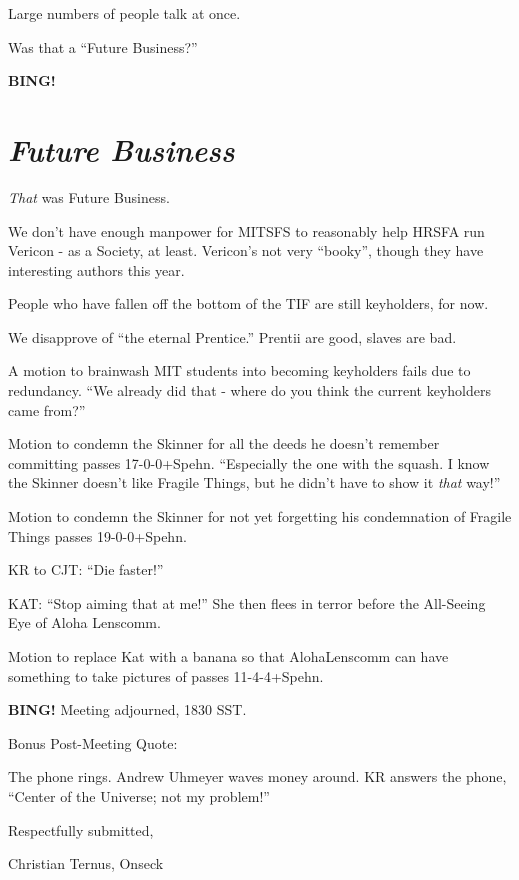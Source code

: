 \documentclass[10pt]{article}
\newcommand{\bing}{{\bf BING!} }
\newcommand{\goto}[1]{\bing \vskip 12pt \section*{{\em{#1}}}}
\begin{document}
Large numbers of people talk at once.

Was that a ``Future Business?''

\goto{Future Business}

\emph{That} was Future Business.

We don't have enough manpower for MITSFS to reasonably help HRSFA run Vericon - as a Society, at least.  Vericon's not very ``booky'', though they have interesting authors this year.

People who have fallen off the bottom of the TIF are still keyholders, for now.

We disapprove of ``the eternal Prentice.''  Prentii are good, slaves are bad.

A motion to brainwash MIT students into becoming keyholders fails due to redundancy.  ``We already did that - where do you think the current keyholders came from?''

Motion to condemn the Skinner for all the deeds he doesn't remember committing passes 17-0-0+Spehn.  ``Especially the one with the squash. I know the Skinner doesn't like Fragile Things, but he didn't have to show it \emph{that} way!''

Motion to condemn the Skinner for not yet forgetting his condemnation of Fragile Things passes 19-0-0+Spehn.

KR to CJT: ``Die faster!''

KAT: ``Stop aiming that at me!''  She then flees in terror before the All-Seeing Eye of Aloha Lenscomm.

Motion to replace Kat with a banana so that AlohaLenscomm can have something to take pictures of passes 11-4-4+Spehn.

\bing
\noindent
Meeting adjourned, 1830 SST.

Bonus Post-Meeting Quote:

The phone rings.  Andrew Uhmeyer waves money around.  KR answers the phone, ``Center of the Universe; not my problem!'' 

\vspace{18pt}

\centerline{Respectfully submitted,}
\centerline{Christian Ternus, Onseck}
\end{document}
